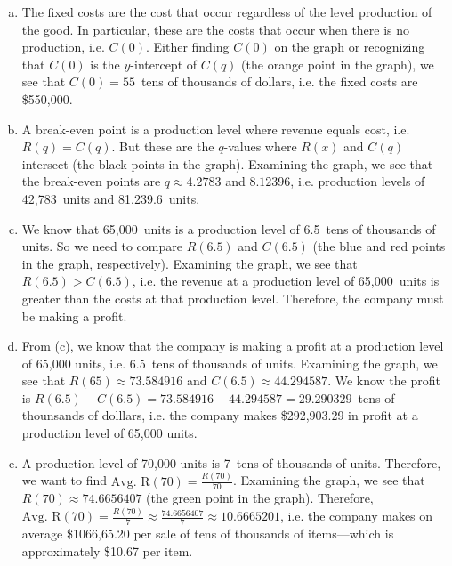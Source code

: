 \documentclass[12pt,letterpaper]{exam}
\begin{document}
\begin{questions}
\sol 
\begin{enumerate}[(a)]
\item The fixed costs are the cost that occur regardless of the level production of the good. In particular, these are the costs that occur when there is no production, i.e. $C(0)$. Either finding $C(0)$ on the graph or recognizing that $C(0)$ is the $y$-intercept of $C(q)$ (the orange point in the graph), we see that $C(0)= 55$~tens of thousands of dollars, i.e. the fixed costs are \$550,000. \pspace

\item A break-even point is a production level where revenue equals cost, i.e. $R(q)= C(q)$. But these are the $q$-values where $R(x)$ and $C(q)$ intersect (the black points in the graph). Examining the graph, we see that the break-even points are $q \approx 4.2783$ and $8.12396$, i.e. production levels of 42,783~units and 81,239.6~units. \pspace

\item We know that 65,000~units is a production level of 6.5~tens of thousands of units. So we need to compare $R(6.5)$ and $C(6.5)$ (the blue and red points in the graph, respectively). Examining the graph, we see that $R(6.5) > C(6.5)$, i.e. the revenue at a production level of 65,000~units is greater than the costs at that production level. Therefore, the company must be making a profit. \pspace

\item From (c), we know that the company is making a profit at a production level of 65,000 units, i.e. 6.5~tens of thousands of units. Examining the graph, we see that $R(65) \approx 73.584916$ and $C(6.5) \approx 44.294587$. We know the profit is $R(6.5) - C(6.5)= 73.584916 - 44.294587= 29.290329$~tens of thounsands of dolllars, i.e. the company makes \$292,903.29 in profit at a production level of 65,000 units. \pspace

\item A production level of 70,000 units is 7~tens of thousands of units. Therefore, we want to find $\text{Avg. R}(70)= \frac{R(70)}{70}$. Examining the graph, we see that $R(70) \approx 74.6656407$ (the green point in the graph). Therefore, $\text{Avg. R}(70)= \frac{R(70)}{7} \approx \frac{74.6656407}{7} \approx 10.6665201$, i.e. the company makes on average \$1066,65.20 per sale of tens of thousands of items---which is approximately \$10.67 per item. 
\end{enumerate}




\end{questions}
\end{document}
